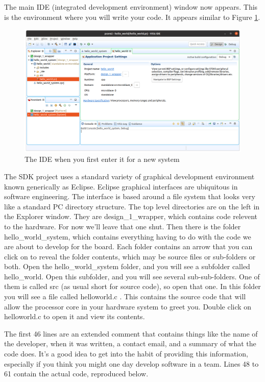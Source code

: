 \documentclass[../physical_computing.tex]{subfiles}
\begin{document}
The main IDE (integrated development environment) window now appears. This is the environment where you will write your code. It appears similar to Figure \ref{fig:firstide}.

\begin{figure}[h!]
    \centering
    \includegraphics[width=\textwidth]{figures/firstide.png}
    \caption{The IDE when you first enter it for a new system}
    \label{fig:firstide}
\end{figure}

The SDK project uses a standard variety of graphical development
environment known generically as Eclipse. Eclipse graphical interfaces
are ubiquitous in software engineering. The interface is based 
around a file system that looks very like a standard PC directory 
structure. The top level directories are on the left in the Explorer
window. They are design\_1\_wrapper, which contains code relevent to 
the hardware. For now we'll leave that one shut. Then there is the 
folder hello\_world\_system, which contains everything having to do with the
code we are about to develop for the board. Each folder contains an
arrow that you can click on to reveal the folder contents, which may
be source files or sub-folders or both. Open the hello\_world\_system
folder, and you will see a subfolder called hello\_world. Open this
subfolder, and you will see several sub-sub-folders. One of them is
called src (as usual short for source code), so open that one. In
this folder you will see a file called helloworld.c . This contains the
source code that will allow the processor core in your hardware system
to greet you. Double click on helloworld.c to open it and view its 
contents.

The first 46 lines are an extended comment that contains things like
the name of the developer, when it was written, a contact email, and
a summary of what the code does. It's a good idea to get into the habit
of providing this information, especially if you think you might one
day develop software in a team. Lines 48 to 61 contain the actual code,
reproduced below.
\end{document}
